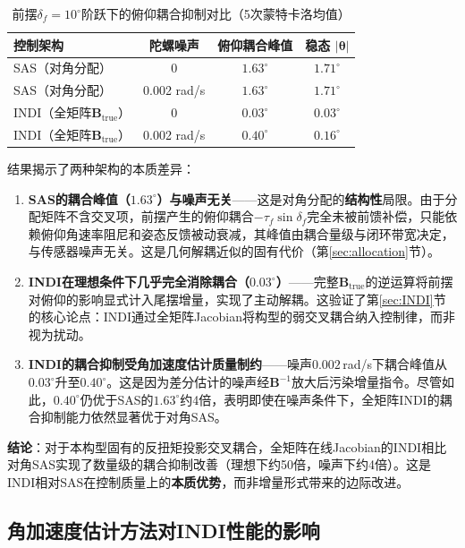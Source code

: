 \begin{table}[H]
\centering
\caption{前摆$\delta_f=10^\circ$阶跃下的俯仰耦合抑制对比（5次蒙特卡洛均值）}
\label{tab:coupling_rejection}
\small
\begin{tabular}{l c c c}
\toprule
\textbf{控制架构} & \textbf{陀螺噪声} & \textbf{俯仰耦合峰值} & \textbf{稳态} $\boldsymbol{|\theta|}$ \\
\midrule
SAS（对角分配） & 0 & $1.63^\circ$ & $1.71^\circ$ \\
SAS（对角分配） & 0.002 rad/s & $1.63^\circ$ & $1.71^\circ$ \\
INDI（全矩阵$\mathbf{B}_{\mathrm{true}}$） & 0 & $\mathbf{0.03^\circ}$ & $0.03^\circ$ \\
INDI（全矩阵$\mathbf{B}_{\mathrm{true}}$） & 0.002 rad/s & $\mathbf{0.40^\circ}$ & $0.16^\circ$ \\
\bottomrule
\end{tabular}
\end{table}

结果揭示了两种架构的本质差异：

\begin{enumerate}[label=(\arabic*)]
    \item \textbf{SAS的耦合峰值（$1.63^\circ$）与噪声无关}——这是对角分配的\textbf{结构性}局限。由于分配矩阵不含交叉项，前摆产生的俯仰耦合$-\tau_f\sin\delta_f$完全未被前馈补偿，只能依赖俯仰角速率阻尼和姿态反馈被动衰减，其峰值由耦合量级与闭环带宽决定，与传感器噪声无关。这是几何解耦近似的固有代价（第\ref{sec:allocation}节）。
    \item \textbf{INDI在理想条件下几乎完全消除耦合（$0.03^\circ$）}——完整$\mathbf{B}_{\mathrm{true}}$的逆运算将前摆对俯仰的影响显式计入尾摆增量，实现了主动解耦。这验证了第\ref{sec:INDI}节的核心论点：INDI通过全矩阵Jacobian将构型的弱交叉耦合纳入控制律，而非视为扰动。
    \item \textbf{INDI的耦合抑制受角加速度估计质量制约}——噪声$0.002$\,rad/s下耦合峰值从$0.03^\circ$升至$0.40^\circ$。这是因为差分估计的噪声经$\mathbf{B}^{-1}$放大后污染增量指令。尽管如此，$0.40^\circ$仍优于SAS的$1.63^\circ$约4倍，表明即使在噪声条件下，全矩阵INDI的耦合抑制能力依然显著优于对角SAS。
\end{enumerate}

\textbf{结论}：对于本构型固有的反扭矩投影交叉耦合，全矩阵在线Jacobian的INDI相比对角SAS实现了数量级的耦合抑制改善（理想下约50倍，噪声下约4倍）。这是INDI相对SAS在控制质量上的\textbf{本质优势}，而非增量形式带来的边际改进。

\subsection{角加速度估计方法对INDI性能的影响}
\label{sec:estimator_study}

